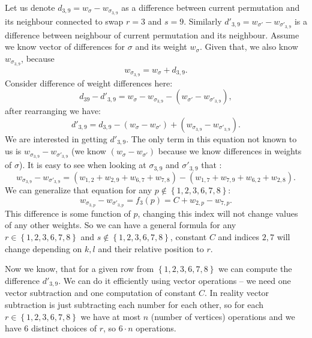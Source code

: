 		Let us denote $d_{3,9} = w_{\sigma} - w_{\sigma_{3,9}}$ as a difference between current permutation and its neighbour connected to swap  $r=3$ and $s=9$. Similarly $d'_{3,9} = w_{\sigma'} - w_{\sigma'_{3,9}}$ is a difference between neighbour of current permutation and its neighbour. Assume we know vector of differences for $\sigma$ and its weight $w_\sigma$. Given that, we also know $w_{\sigma_{3,9}}$, because
		\begin{equation*}
			w_{\sigma_{3,9}} = w_\sigma + d_{3,9}.
		\end{equation*}
		Consider difference of weight differences here:
		\begin{equation*}
			d_{39} - d'_{3,9} = w_{\sigma} - w_{\sigma_{3,9}} - (w_{\sigma'} - w_{\sigma'_{3,9}}),
		\end{equation*}
		after rearranging we have:
		\begin{equation*}
			d'_{3,9} = d_{3,9} - (w_{\sigma} - w_{\sigma'}) + (w_{\sigma_{3,9}} - w_{\sigma'_{3,9}}).
		\end{equation*}
		We are interested in getting $d'_{3,9}$. The only term in this equation not known to us is $w_{\sigma_{3,9}} - w_{\sigma'_{3,9}}$ (we know $(w_{\sigma} - w_{\sigma'})$ because we know differences in weights of $\sigma$). It is easy to see when looking at $\sigma_{3,9}$ and $\sigma'_{3,9}$ that :
		\begin{equation*}
			w_{\sigma_{3,9}} - w_{\sigma'_{3,9}} = (w_{1,2} + w_{2,9} + w_{6,7} + w_{7,8}) - (w_{1,7} + w_{7,9} + w_{6,2} + w_{2,8}).
		\end{equation*}
		We can generalize that equation for any $p \notin \left\{ 1,2,3,6,7,8 \right\}$:
		\begin{equation*}
			w_{\sigma_{3,p}} - w_{\sigma'_{3,p}} = f_3(p) = C + w_{2,p} - w_{7,p}.
		\end{equation*}
		This difference is some function of $p$, changing this index will not change values of any other weights. So we can have a general formula for any $r \in \left\{ 1,2,3,6,7,8 \right\}$ and $s \notin \left\{ 1,2,3,6,7,8 \right\}$, constant $C$ and indices $2,7$ will change depending on $k,l$ and their relative position to $r$.
		
		Now we know, that for a given row from $\left\{ 1,2,3,6,7,8 \right\}$ we can compute the difference $d'_{3,9}$. We can do it efficiently using vector operations -- we need one vector subtraction and one computation of constant $C$. In reality vector subtraction is just subtracting each number for each other, so for each $r \in \left\{ 1,2,3,6,7,8 \right\}$ we have at most $n$ (number of vertices) operations and we have $6$ distinct choices of $r$, so $6\cdot n$ operations.
	
